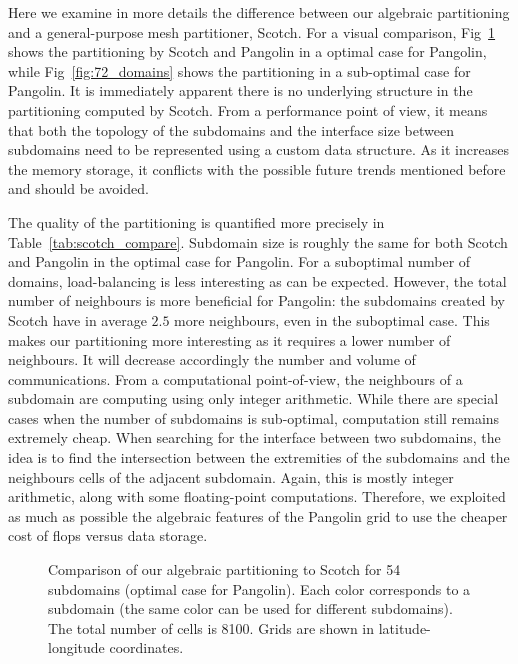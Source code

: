 Here we examine in more details the difference between our algebraic
partitioning and a general-purpose mesh partitioner, Scotch. For a visual
comparison, Fig~\ref{fig:54_domains} shows the partitioning by Scotch and
Pangolin in a optimal case for Pangolin, while Fig~\ref{fig:72_domains} shows
the partitioning in a sub-optimal case for Pangolin. It is immediately apparent
there is no underlying structure in the partitioning computed by Scotch. From a
performance point of view, it means that both the topology of the subdomains and
the interface size between subdomains need to be represented using a custom data
structure. As it increases the memory storage, it conflicts with the possible
future trends mentioned before and should be avoided.

The quality of the partitioning is quantified more precisely in
Table~\ref{tab:scotch_compare}. Subdomain size is roughly the same for both Scotch
and Pangolin in the optimal case for Pangolin. For a suboptimal number of
domains, load-balancing is less interesting as can be expected. However, the
total number of neighbours is more beneficial for Pangolin: the subdomains created
by Scotch have in average $2.5$ more neighbours, even in the suboptimal case.
This makes our partitioning more interesting as it requires a lower number of
neighbours.  It will decrease accordingly the number and volume of
communications. From a computational point-of-view, the neighbours of a subdomain
are computing using only integer arithmetic. While there are special cases when
the number of subdomains is sub-optimal, computation still remains extremely cheap.
When searching for the interface between two subdomains, the idea is to find the
intersection between the extremities of the subdomains and the neighbours cells of
the adjacent subdomain.  Again, this is mostly integer arithmetic, along with some
floating-point computations. Therefore, we exploited as much as possible the
algebraic features of the Pangolin grid to use the cheaper cost of flops versus
data storage.

\begin{figure}
  \hfill
  \caption{%
    Comparison of our algebraic partitioning
     to Scotch  for 54 subdomains
    (optimal case for Pangolin).  Each color corresponds to a subdomain (the
    same color can be used for different subdomains). The total number of
    cells is 8100. Grids are shown in latitude-longitude coordinates.
  }
\label{fig:54_domains}
\end{figure}

